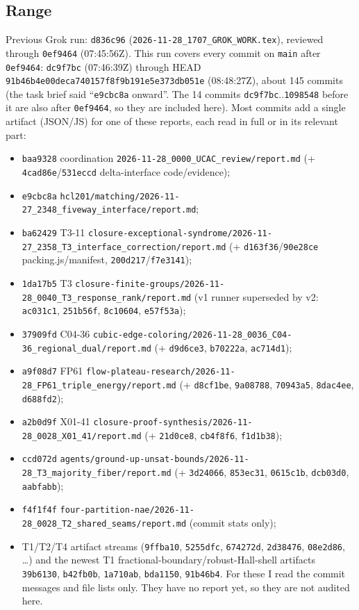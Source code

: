 \documentclass[11pt]{article}
\theoremstyle{remark}
\begin{document}
\subsection{Range}
Previous Grok run: \texttt{d836c96} (\texttt{2026-11-28\_1707\_GROK\_WORK.tex}),
reviewed through \texttt{0ef9464} (07:45:56Z). This run covers every commit on
\texttt{main} after \texttt{0ef9464}: \texttt{dc9f7bc} (07:46:39Z) through HEAD
\texttt{91b46b4e00deca740157f8f9b191e5e373db051e} (08:48:27Z), about 145 commits (the
task brief said ``\texttt{e9cbc8a} onward''. The 14 commits \texttt{dc9f7bc}..\texttt{1098548}
before it are also after \texttt{0ef9464}, so they are included here). Most commits add a single
artifact (JSON/JS) for one of these reports, each read in full or in its relevant part:
\begin{itemize}\setlength\itemsep{0pt}
\item \texttt{baa9328} coordination \texttt{2026-11-28\_0000\_UCAC\_review/report.md} (+ \texttt{4cad86e}/\texttt{531eccd} delta-interface code/evidence);
\item \texttt{e9cbc8a} \texttt{hcl201/matching/2026-11-27\_2348\_fiveway\_interface/report.md};
\item \texttt{ba62429} T3-11 \texttt{closure-exceptional-syndrome/2026-11-27\_2358\_T3\_interface\_correction/report.md} (+ \texttt{d163f36}/\texttt{90e28ce} packing.js/manifest, \texttt{200d217}/\texttt{f7e3141});
\item \texttt{1da17b5} T3 \texttt{closure-finite-groups/2026-11-28\_0040\_T3\_response\_rank/report.md} (v1 runner superseded by v2: \texttt{ac031c1}, \texttt{251b56f}, \texttt{8c10604}, \texttt{e57f53a});
\item \texttt{37909fd} C04-36 \texttt{cubic-edge-coloring/2026-11-28\_0036\_C04-36\_regional\_dual/report.md} (+ \texttt{d9d6ce3}, \texttt{b70222a}, \texttt{ac714d1});
\item \texttt{a9f08d7} FP61 \texttt{flow-plateau-research/2026-11-28\_FP61\_triple\_energy/report.md} (+ \texttt{d8cf1be}, \texttt{9a08788}, \texttt{70943a5}, \texttt{8dac4ee}, \texttt{d688fd2});
\item \texttt{a2b0d9f} X01-41 \texttt{closure-proof-synthesis/2026-11-28\_0028\_X01\_41/report.md} (+ \texttt{21d0ce8}, \texttt{cb4f8f6}, \texttt{f1d1b38});
\item \texttt{ccd072d} \texttt{agents/ground-up-unsat-bounds/2026-11-28\_T3\_majority\_fiber/report.md} (+ \texttt{3d24066}, \texttt{853ec31}, \texttt{0615c1b}, \texttt{dcb03d0}, \texttt{aabfabb});
\item \texttt{f4f1f4f} \texttt{four-partition-nae/2026-11-28\_0028\_T2\_shared\_seams/report.md} (commit stats only);
\item T1/T2/T4 artifact streams (\texttt{9ffba10}, \texttt{5255dfc}, \texttt{674272d}, \texttt{2d38476}, \texttt{08e2d86}, \ldots) and the newest
T1 fractional-boundary/robust-Hall-shell artifacts \texttt{39b6130}, \texttt{b42fb0b}, \texttt{1a710ab}, \texttt{bda1150}, \texttt{91b46b4}. For these I read the commit messages and file lists only. They have no report yet, so they are not audited here.
\end{itemize}
\end{document}
